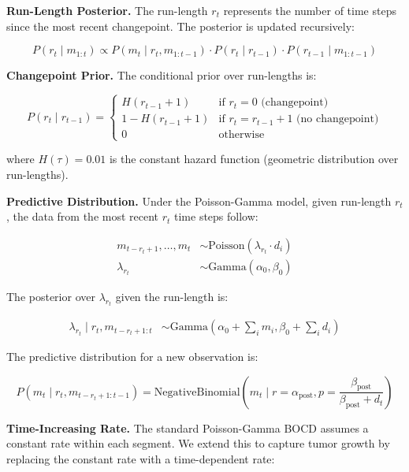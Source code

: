 \documentclass[10pt,a4paper]{article}
\begin{document}
\textbf{Run-Length Posterior.} The run-length $r_t$ represents the number of time steps since the most recent changepoint. The posterior is updated recursively:

\begin{equation}
P(r_t \mid m_{1:t}) \propto P(m_t \mid r_t, m_{1:t-1}) \cdot P(r_t \mid r_{t-1}) \cdot P(r_{t-1} \mid m_{1:t-1})
\end{equation}

\textbf{Changepoint Prior.} The conditional prior over run-lengths is:

\begin{equation}
P(r_t \mid r_{t-1}) = \begin{cases}
H(r_{t-1} + 1) & \text{if } r_t = 0 \text{ (changepoint)} \\
1 - H(r_{t-1} + 1) & \text{if } r_t = r_{t-1} + 1 \text{ (no changepoint)} \\
0 & \text{otherwise}
\end{cases}
\end{equation}

where $H(\tau) = 0.01$ is the constant hazard function (geometric distribution over run-lengths).

\textbf{Predictive Distribution.} Under the Poisson-Gamma model, given run-length $r_t$, the data from the most recent $r_t$ time steps follow:

\begin{align}
m_{t-r_t+1}, \ldots, m_t &\sim \text{Poisson}(\lambda_{r_t} \cdot d_i) \\
\lambda_{r_t} &\sim \text{Gamma}(\alpha_0, \beta_0)
\end{align}

The posterior over $\lambda_{r_t}$ given the run-length is:

\begin{align}
\lambda_{r_t} \mid r_t, m_{t-r_t+1:t} &\sim \text{Gamma}\left(\alpha_0 + \sum_{i} m_i, \beta_0 + \sum_{i} d_i\right)
\end{align}

The predictive distribution for a new observation is:

\begin{equation}
P(m_t \mid r_t, m_{t-r_t+1:t-1}) = \text{NegativeBinomial}\left(m_t \mid r = \alpha_{\text{post}}, p = \frac{\beta_{\text{post}}}{\beta_{\text{post}} + d_t}\right)
\end{equation}

\textbf{Time-Increasing Rate.} The standard Poisson-Gamma BOCD assumes a constant rate within each segment. We extend this to capture tumor growth by replacing the constant rate with a time-dependent rate:
\end{document}
